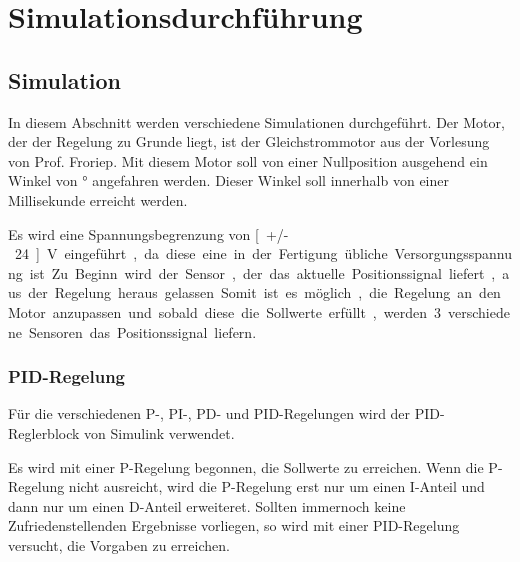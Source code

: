 \newpage




\chapter{Simulationsdurchführung}
\label{chap:Simulationsdurchfuehrung}

\section{Simulation}
In diesem Abschnitt werden verschiedene Simulationen durchgeführt.
Der Motor, der der Regelung zu Grunde liegt, ist der Gleichstrommotor aus der Vorlesung von Prof. Froriep.
Mit diesem Motor soll von einer Nullposition ausgehend ein Winkel von \unit[20]{°} angefahren werden. 
Dieser Winkel soll innerhalb von einer Millisekunde erreicht werden.

Es wird eine Spannungsbegrenzung von \unit[+/-24]{V} eingeführt, da diese eine in der Fertigung übliche Versorgungsspannung ist.

Zu Beginn wird der Sensor, der das aktuelle Positionssignal liefert, aus der Regelung heraus gelassen. 
Somit ist es möglich, die Regelung an den Motor anzupassen und sobald
diese die Sollwerte erfüllt, werden 3 verschiedene Sensoren das Positionssignal liefern.

\subsection{PID-Regelung}
\label{chap:pidregelung}
Für die verschiedenen P-, PI-, PD- und PID-Regelungen wird der PID-Reglerblock von Simulink verwendet.

Es wird mit einer P-Regelung begonnen, die Sollwerte zu erreichen. Wenn die P-Regelung nicht ausreicht, wird die P-Regelung erst nur um einen I-Anteil und dann nur um einen 
D-Anteil erweiteret. 
Sollten immernoch keine Zufriedenstellenden Ergebnisse vorliegen, so wird mit einer PID-Regelung versucht, die Vorgaben zu erreichen.

